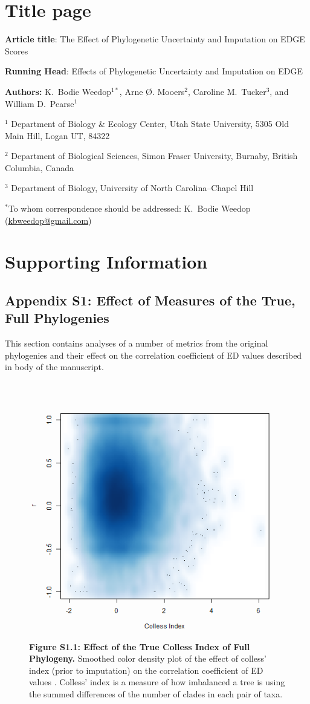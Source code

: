 \documentclass[10pt,english]{article}
\begin{document}
\section*{Title page}

\textbf{Article title}: The Effect of Phylogenetic Uncertainty and Imputation on EDGE Scores

\textbf{Running Head}: Effects of Phylogenetic Uncertainty and Imputation on EDGE

\textbf{Authors:} K.\ Bodie Weedop$^{1*}$, Arne \O. Mooers$^2$, Caroline M.\ Tucker$^3$, and William D.\ Pearse$^{1}$\

$^1$ Department of Biology \& Ecology Center, Utah State University,
5305 Old Main Hill, Logan UT, 84322

$^2$ Department of Biological Sciences, Simon Fraser University, Burnaby,
British Columbia, Canada

$^3$ Department of Biology, University of North Carolina–Chapel Hill

$^*$To whom correspondence should be addressed: K.\ Bodie Weedop (\url{kbweedop@gmail.com})

\clearpage
 
\section*{Supporting Information}

\subsection*{Appendix S1: Effect of Measures of the True, Full Phylogenies}

This section contains analyses of a number of metrics from the original
phylogenies and their effect on the correlation coefficient of ED values
described in body of the manuscript.

\begin{figure}[!ht]
  \center
  \includegraphics[width=.5\textwidth]{../figures/trueColless.png}
  \caption*{\textbf{Figure S1.1: Effect of the True Colless Index of Full Phylogeny.} 
  Smoothed color density plot of the effect of colless' index (prior to
  imputation) on the correlation coefficient of ED values . Colless' index is a
  measure of how imbalanced a tree is using the summed differences of the number
  of clades in each pair of taxa.}
\end{figure}
\end{document}
